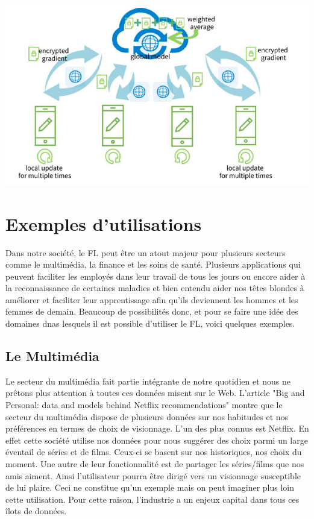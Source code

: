 \documentclass[12pt,a4paper,french]{report}
\begin{document}
\begin{center}
	\includegraphics[scale=0.8]{fl}
	\label{fig1}
\end{center}






\chapter{Exemples d'utilisations}

Dans notre société, le FL peut être un atout majeur pour plusieurs secteurs comme le multimédia, la finance et les soins de santé. Plusieurs applications qui peuvent faciliter les employés dans leur travail de tous les jours ou encore aider à la reconnaissance de certaines maladies et bien entendu aider nos têtes blondes à améliorer et faciliter leur apprentissage afin qu'ils deviennent les hommes et les femmes de demain. Beaucoup de possibilités donc, et pour se faire une idée des domaines dnas lesquels il est possible d'utiliser le FL, voici quelques exemples. 


\section{Le Multimédia}

Le secteur du multimédia fait partie intégrante de notre quotidien et nous ne prêtons plus attention à toutes ces données misent sur le Web. L'article "Big and Personal: data and models behind Netflix recommendations" montre que le secteur du multimédia dispose de plusieurs données sur nos habitudes et nos préférences en termes de choix de visionnage. L'un des plus connus est Netflix. En effet cette société utilise nos données pour nous suggérer des choix parmi un large éventail de séries et de films. Ceux-ci se basent sur nos historiques, nos choix du moment. Une autre de leur fonctionnalité est de partager les séries/films que nos amis aiment. Ainsi l'utilisateur pourra être dirigé vers un visionnage susceptible de lui plaire. Ceci ne constitue qu'un exemple mais on peut imaginer plus loin cette utilisation. Pour cette raison, l'industrie a un enjeux capital dans tous ces îlots de données.\\
\end{document}
